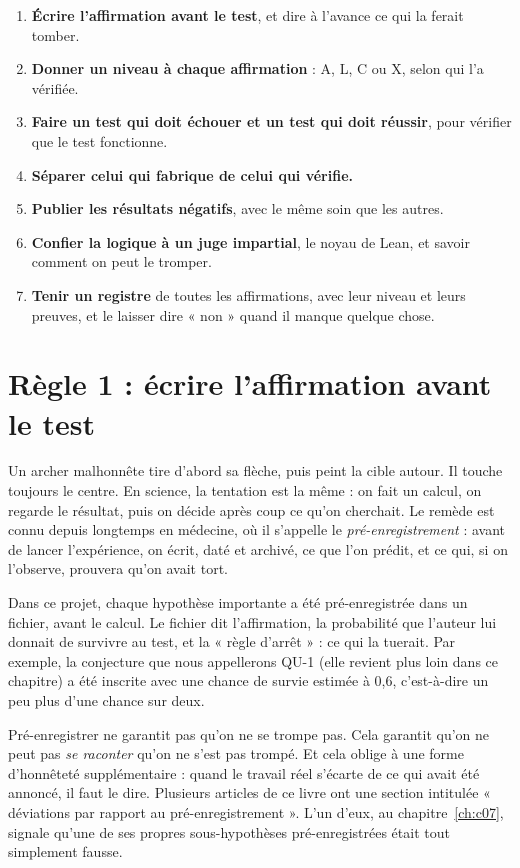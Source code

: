 \begin{encadre}
\begin{enumerate}[leftmargin=1.6em]
\item \textbf{Écrire l'affirmation avant le test}, et dire à l'avance ce qui la ferait tomber.
\item \textbf{Donner un niveau à chaque affirmation} : A, L, C ou X, selon qui l'a vérifiée.
\item \textbf{Faire un test qui doit échouer et un test qui doit réussir}, pour vérifier que le test fonctionne.
\item \textbf{Séparer celui qui fabrique de celui qui vérifie.}
\item \textbf{Publier les résultats négatifs}, avec le même soin que les autres.
\item \textbf{Confier la logique à un juge impartial}, le noyau de Lean, et savoir comment on peut le tromper.
\item \textbf{Tenir un registre} de toutes les affirmations, avec leur niveau et leurs preuves, et le laisser dire
« non » quand il manque quelque chose.
\end{enumerate}
\end{encadre}

\section{Règle 1 : écrire l'affirmation avant le test}

Un archer malhonnête tire d'abord sa flèche, puis peint la cible autour. Il touche toujours le centre. En science, la
tentation est la même : on fait un calcul, on regarde le résultat, puis on décide après coup ce qu'on cherchait. Le
remède est connu depuis longtemps en médecine, où il s'appelle le \emph{pré-enregistrement} : avant de lancer
l'expérience, on écrit, daté et archivé, ce que l'on prédit, et ce qui, si on l'observe, prouvera qu'on avait tort.

Dans ce projet, chaque hypothèse importante a été pré-enregistrée dans un fichier, avant le calcul. Le fichier dit
l'affirmation, la probabilité que l'auteur lui donnait de survivre au test, et la « règle d'arrêt » : ce qui la tuerait.
Par exemple, la conjecture que nous appellerons QU-1 (elle revient plus loin dans ce chapitre) a été inscrite avec une
chance de survie estimée à 0,6, c'est-à-dire un peu plus d'une chance sur deux.

Pré-enregistrer ne garantit pas qu'on ne se trompe pas. Cela garantit qu'on ne peut pas \emph{se raconter} qu'on ne
s'est pas trompé. Et cela oblige à une forme d'honnêteté supplémentaire : quand le travail réel s'écarte de ce qui
avait été annoncé, il faut le dire. Plusieurs articles de ce livre ont une section intitulée « déviations par rapport
au pré-enregistrement ». L'un d'eux, au chapitre~\ref{ch:c07}, signale qu'une de ses propres sous-hypothèses
pré-enregistrées était tout simplement fausse.


